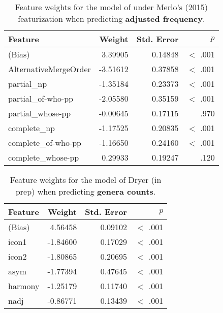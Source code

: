 \documentclass[11pt]{article}
\newcommand{\lt}{<}
\begin{document}
\begin{table}[ht!]
  \centering
  \begin{tabular}{|l|r|r|r|}
    \hline
    Feature & Weight & Std. Error & $p$ \\
    \hline
    (Bias)                    &  3.39905 &    0.14848 &  $\lt$ .001 \\
    AlternativeMergeOrder & -3.51612 &   0.37858 & $\lt$ .001 \\
    partial\_np                     &  -1.35184 &    0.23373 & $\lt$ .001 \\
    partial\_of-who-pp              &  -2.05580 &    0.35159 & $\lt$ .001  \\
    partial\_whose-pp                &  -0.00645 &   0.17115 & .970 \\
    complete\_np                    &  -1.17525 &    0.20835 & $\lt$ .001 \\
    complete\_of-who-pp             &  -1.16650 &    0.24160 & $\lt$ .001 \\
    complete\_whose-pp               &  0.29933 &    0.19247 & .120 \\
    \hline
  \end{tabular}
  \caption{Feature weights for the model of \citet{cinque2005deriving} under Merlo's (2015) featurization when predicting \textbf{adjusted frequency}.}
\end{table}



\begin{table}[ht!]
  \centering
  \begin{tabular}{|l|r|r|r|}
    \hline
    Feature & Weight & Std. Error & $p$ \\
    \hline
    (Bias) & 4.56458 &    0.09102 &  $\lt$ .001 \\
    icon1      & -1.84600 &    0.17029 & $\lt$ .001 \\
    icon2      & -1.80865 &    0.20695 & $\lt$ .001 \\
    asym       & -1.77394 &    0.47645 & $\lt$ .001 \\
    harmony    & -1.25179 &    0.11740 & $\lt$ .001 \\
    nadj       & -0.86771 &    0.13439 & $\lt$ .001 \\
    \hline
  \end{tabular}
  \caption{Feature weights for the model of Dryer (in prep) when predicting \textbf{genera counts}.}
\end{table}
\end{document}
